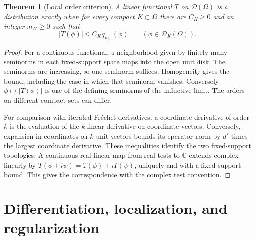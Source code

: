 \documentclass[11pt,oneside,openany]{book}
\newtheorem{theorem}{Theorem}[chapter]
\theoremstyle{definition}
\theoremstyle{remark}
\begin{document}
\begin{theorem}[Local order criterion]
\label{p102:AN-11-C01-R02}
A linear functional \(T\) on \(\mathcal D(\Omega)\) is a distribution exactly when for every compact \(K\subset\Omega\) there are \(C_K\geq0\) and an integer \(m_K\geq0\) such that
\[
 |T(\phi)|\leq C_K q_{m_K}(\phi)\qquad(\phi\in\mathcal D_K(\Omega)).
\]
\end{theorem}
\begin{proof}
For a continuous functional, a neighborhood given by finitely many seminorms in each fixed-support space maps into the open unit disk. The seminorms are increasing, so one seminorm suffices. Homogeneity gives the bound, including the case in which that seminorm vanishes. Conversely \(\phi\mapsto |T(\phi)|\) is one of the defining seminorms of the inductive limit. The orders on different compact sets can differ.

For comparison with iterated Fr\'echet derivatives, a coordinate derivative of order \(k\) is the evaluation of the \(k\)-linear derivative on coordinate vectors. Conversely, expansion in coordinates on \(k\) unit vectors bounds its operator norm by \(d^k\) times the largest coordinate derivative. These inequalities identify the two fixed-support topologies. A continuous real-linear map from real tests to \(\mathbb C\) extends complex-linearly by \(T(\phi+i\psi)=T(\phi)+iT(\psi)\), uniquely and with a fixed-support bound. This gives the correspondence with the complex test convention.
\end{proof}

\section{Differentiation, localization, and regularization}
\end{document}
